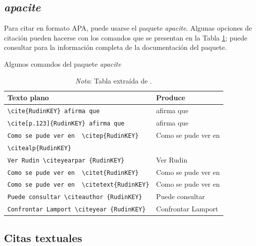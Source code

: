 \subsection{\emph{apacite}}
\noindent Para citar en formato APA, puede usarse el paquete \emph{apacite}. Algunas opciones de citación pueden hacerse con los comandos que se presentan en la Tabla \ref{ComandosApacite}; puede consultar \cite{meijer2013apacite} para la información completa de la documentación del paquete.

\begin{table}[h!]
\caption{Algunos comandos del paquete \emph{apacite} }
\centering
\scriptsize
	\begin{tabular}{ll}
		\hline
		\textbf{Texto plano}&\textbf{Produce}\\
		\hline
		\verb|\cite{RudinKEY} afirma que|&\cite{RudinKEY} afirma que \\
		\verb|\cite[p.123]{RudinKEY} afirma que|&\cite[p.123]{RudinKEY} afirma que\\
		\verb|Como se pude ver en  \citep{RudinKEY}|&Como se pude ver en  \citep{RudinKEY}\\
		\verb|\citealp{RudinKEY}|&\citealp{RudinKEY}\\
		\verb|Ver Rudin \citeyearpar {RudinKEY}|&Ver Rudin \citeyearpar {RudinKEY}\\
		\verb|Como se pude ver en  \citet{RudinKEY}|&Como se pude ver en  \citet{RudinKEY}\\
		\verb|Como se pude ver en  \citetext{RudinKEY}|&Como se pude ver en  \citetext{RudinKEY}\\
		\verb|Puede consultar \citeauthor {RudinKEY}|&Puede consultar \citeauthor {RudinKEY}\\
		\verb|Confrontar Lamport \citeyear {RudinKEY}|&Confrontar Lamport \citeyear {RudinKEY}\\
		\hline
	\end{tabular}
\label{ComandosApacite}
\medskip
\caption*{\emph{Nota}: Tabla extraída de \citet[p. 50]{WunschKEY}.}
\end{table}

\subsection{Citas textuales}

